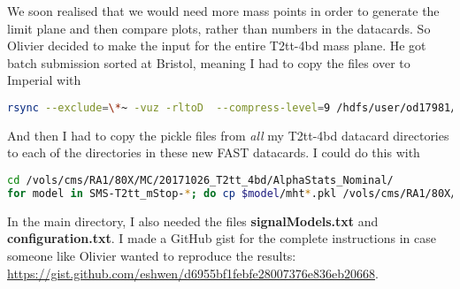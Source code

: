 We soon realised that we would need more mass points in order to generate the limit plane and then compare plots, rather than numbers in the datacards. So Olivier decided to make the input for the entire T2tt-4bd mass plane. He got batch submission sorted at Bristol, meaning I had to copy the files over to Imperial with

\begin{lstlisting}[belowskip=-0.7cm, language=sh, numbers=none]
rsync --exclude=\*~ -vuz -rltoD  --compress-level=9 /hdfs/user/od17981/FAST-RA1/<dir> ebhal@lx01.hep.ph.ic.ac.uk:"/vols/cms/RA1/80X/MC/$(date '+%Y%m%d')_FAST-RA1_datacards_T2tt-4bd/"
\end{lstlisting}

And then I had to copy the pickle files from \emph{all} my T2tt-4bd datacard directories to each of the directories in these new FAST datacards. I could do this with

\begin{lstlisting}[belowskip=-0.7cm, language=sh, numbers=none]
cd /vols/cms/RA1/80X/MC/20171026_T2tt_4bd/AlphaStats_Nominal/
for model in SMS-T2tt_mStop-*; do cp $model/mht*.pkl /vols/cms/RA1/80X/MC/<new_dir>/${model}/; done
\end{lstlisting}

In the main directory, I also needed the files \textbf{signalModels.txt} and \textbf{configuration.txt}. I made a GitHub gist for the complete instructions in case someone like Olivier wanted to reproduce the results: \url{https://gist.github.com/eshwen/d6955bf1febfe28007376e836eb20668}.
